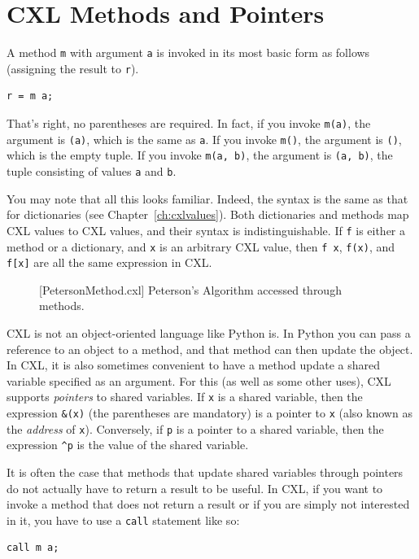 \documentclass{report}
\newenvironment{code}{
\tcolorbox
}{
\endtcolorbox
}
\begin{document}
\chapter{CXL Methods and Pointers}

A method \texttt{m} with argument \texttt{a} is invoked in its
most basic form as follows (assigning the result to \texttt{r}).
\begin{code}
\begin{verbatim}
r = m a;
\end{verbatim}
\end{code}
That's right, no parentheses are required.  In fact, if you invoke
\texttt{m(a)}, the argument is \texttt{(a)}, which is the same
as \texttt{a}.
If you invoke \texttt{m()}, the argument is \texttt{()},
which is the empty tuple.
If you invoke \texttt{m(a, b)}, the argument is \texttt{(a, b)},
the tuple consisting of values \texttt{a} and \texttt{b}.

You may note that all this looks familiar.  Indeed, the syntax
is the same as that for dictionaries (see Chapter~\ref{ch:cxlvalues}).
Both dictionaries and methods map CXL values to CXL values,
and their syntax is indistinguishable.
If \texttt{f} is either a method or a
dictionary, and \texttt{x} is an arbitrary CXL value, then
\texttt{f x}, \texttt{f(x)}, and \texttt{f[x]} are all
the same expression in CXL.

\begin{figure}
\begin{code}
\end{code}
\caption{[PetersonMethod.cxl] Peterson's Algorithm accessed through methods.}
\label{fig:petersonmethods}
\end{figure}

CXL is not an object-oriented language like Python is.  In Python
you can pass a reference to an object to a method, and that method
can then update the object.  In CXL, it is also sometimes convenient
to have a method update a shared variable specified as an argument.
For this (as well as some other uses), CXL supports \emph{pointers}
to shared variables.
If \texttt{x} is a shared variable, then the expression \texttt{\&(x)}
(the parentheses are mandatory) is a pointer to \texttt{x}
(also known as the \emph{address} of \texttt{x}).
Conversely, if \texttt{p} is a pointer to a shared variable, then the
expression \texttt{\^{}p} is the value of the shared variable.

It is often the case that methods that update shared variables through
pointers do not actually have to return a result to be useful.
In CXL, if you want to invoke a method that does not return a result
or if you are simply not interested in it,
you have to use a \texttt{call} statement like so:
\begin{code}
\begin{verbatim}
call m a;
\end{verbatim}
\end{code}
\end{document}
